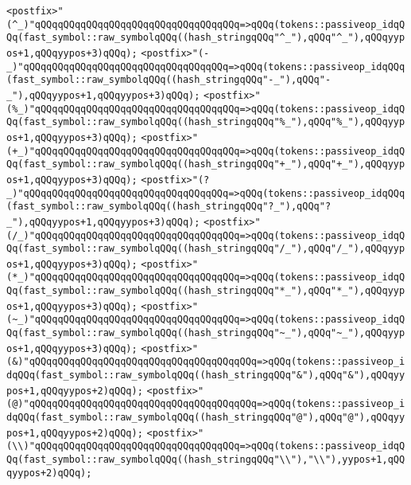\verb|<postfix>"(^_)"qQQqqQQqqQQqqQQqqQQqqQQqqQQqqQQqqQQq=>qQQq(tokens::passiveop_idqQQq(fast_symbol::raw_symbolqQQq((hash_stringqQQq"^_"),qQQq"^_"),qQQqyypos+1,qQQqyypos+3)qQQq);|\newline
\verb|<postfix>"(-_)"qQQqqQQqqQQqqQQqqQQqqQQqqQQqqQQqqQQq=>qQQq(tokens::passiveop_idqQQq(fast_symbol::raw_symbolqQQq((hash_stringqQQq"-_"),qQQq"-_"),qQQqyypos+1,qQQqyypos+3)qQQq);|\newline
\verb|<postfix>"(%_)"qQQqqQQqqQQqqQQqqQQqqQQqqQQqqQQqqQQq=>qQQq(tokens::passiveop_idqQQq(fast_symbol::raw_symbolqQQq((hash_stringqQQq"%_"),qQQq"%_"),qQQqyypos+1,qQQqyypos+3)qQQq);|\newline
\verb|<postfix>"(+_)"qQQqqQQqqQQqqQQqqQQqqQQqqQQqqQQqqQQq=>qQQq(tokens::passiveop_idqQQq(fast_symbol::raw_symbolqQQq((hash_stringqQQq"+_"),qQQq"+_"),qQQqyypos+1,qQQqyypos+3)qQQq);|\newline
\verb|<postfix>"(?_)"qQQqqQQqqQQqqQQqqQQqqQQqqQQqqQQqqQQq=>qQQq(tokens::passiveop_idqQQq(fast_symbol::raw_symbolqQQq((hash_stringqQQq"?_"),qQQq"?_"),qQQqyypos+1,qQQqyypos+3)qQQq);|\newline
\verb|<postfix>"(/_)"qQQqqQQqqQQqqQQqqQQqqQQqqQQqqQQqqQQq=>qQQq(tokens::passiveop_idqQQq(fast_symbol::raw_symbolqQQq((hash_stringqQQq"/_"),qQQq"/_"),qQQqyypos+1,qQQqyypos+3)qQQq);|\newline
\verb|<postfix>"(*_)"qQQqqQQqqQQqqQQqqQQqqQQqqQQqqQQqqQQq=>qQQq(tokens::passiveop_idqQQq(fast_symbol::raw_symbolqQQq((hash_stringqQQq"*_"),qQQq"*_"),qQQqyypos+1,qQQqyypos+3)qQQq);|\newline
\verb|<postfix>"(~_)"qQQqqQQqqQQqqQQqqQQqqQQqqQQqqQQqqQQq=>qQQq(tokens::passiveop_idqQQq(fast_symbol::raw_symbolqQQq((hash_stringqQQq"~_"),qQQq"~_"),qQQqyypos+1,qQQqyypos+3)qQQq);|\newline
\verb|<postfix>"(&)"qQQqqQQqqQQqqQQqqQQqqQQqqQQqqQQqqQQqqQQq=>qQQq(tokens::passiveop_idqQQq(fast_symbol::raw_symbolqQQq((hash_stringqQQq"&"),qQQq"&"),qQQqyypos+1,qQQqyypos+2)qQQq);|\newline
\verb|<postfix>"(@)"qQQqqQQqqQQqqQQqqQQqqQQqqQQqqQQqqQQqqQQq=>qQQq(tokens::passiveop_idqQQq(fast_symbol::raw_symbolqQQq((hash_stringqQQq"@"),qQQq"@"),qQQqyypos+1,qQQqyypos+2)qQQq);|\newline
\verb|<postfix>"(\\)"qQQqqQQqqQQqqQQqqQQqqQQqqQQqqQQqqQQq=>qQQq(tokens::passiveop_idqQQq(fast_symbol::raw_symbolqQQq((hash_stringqQQq"\\"),"\\"),yypos+1,qQQqyypos+2)qQQq);|\newline
